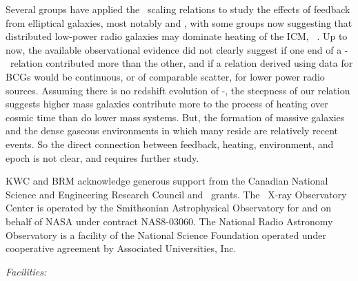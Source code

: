 \documentclass{emulateapj}
\begin{document}
Several groups have applied the \birzan\ scaling relations to study
the effects of feedback from elliptical galaxies, most notably
\citet{best07} and \citet{2007MNRAS.379..260M}, with some groups now
suggesting that distributed low-power radio galaxies may dominate
heating of the ICM, \eg\ \citet{2009arXiv0908.3158H}. Up to now, the
available observational evidence did not clearly suggest if one end of
a \pjet-\prad\ relation contributed more than the other, and if a
relation derived using data for BCGs would be continuous, or of
comparable scatter, for lower power radio sources. Assuming there is
no redshift evolution of \pjet-\prad, the steepness of our relation
suggests higher mass galaxies contribute more to the process of
heating over cosmic time than do lower mass systems. But, the
formation of massive galaxies and the dense gaseous environments in
which many reside are relatively recent events. So the direct
connection between feedback, heating, environment, and epoch is not
clear, and requires further study.

\acknowledgements

KWC and BRM acknowledge generous support from the Canadian National
Science and Engineering Research Council and \cxo\ grants. The
\chandra\ X-ray Observatory Center is operated by the Smithsonian
Astrophysical Observatory for and on behalf of NASA under contract
NAS8-03060. The National Radio Astronomy Observatory is a facility of
the National Science Foundation operated under cooperative agreement
by Associated Universities, Inc.


{\it Facilities:}  







\end{document}
